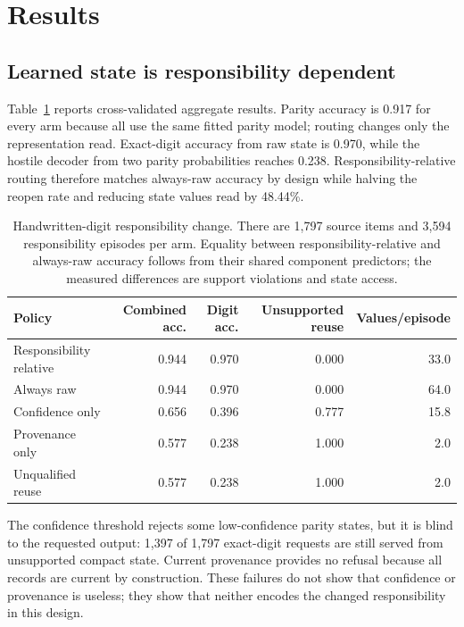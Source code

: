 \documentclass[10pt]{article}
\begin{document}
\section{Results}

\subsection{Learned state is responsibility dependent}

Table~\ref{tab:digits} reports cross-validated aggregate results. Parity accuracy is 0.917 for every arm because all use the same fitted parity model; routing changes only the representation read. Exact-digit accuracy from raw state is 0.970, while the hostile decoder from two parity probabilities reaches 0.238. Responsibility-relative routing therefore matches always-raw accuracy by design while halving the reopen rate and reducing state values read by 48.44\%.

\begin{table}[t]
\centering
\small
\caption{Handwritten-digit responsibility change. There are 1,797 source items and 3,594 responsibility episodes per arm. Equality between responsibility-relative and always-raw accuracy follows from their shared component predictors; the measured differences are support violations and state access.}
\label{tab:digits}
\begin{tabular}{lrrrr}
\toprule
Policy & Combined acc. & Digit acc. & Unsupported reuse & Values/episode \\
\midrule
Responsibility relative & 0.944 & 0.970 & 0.000 & 33.0 \\
Always raw & 0.944 & 0.970 & 0.000 & 64.0 \\
Confidence only & 0.656 & 0.396 & 0.777 & 15.8 \\
Provenance only & 0.577 & 0.238 & 1.000 & 2.0 \\
Unqualified reuse & 0.577 & 0.238 & 1.000 & 2.0 \\
\bottomrule
\end{tabular}
\end{table}

The confidence threshold rejects some low-confidence parity states, but it is blind to the requested output: 1,397 of 1,797 exact-digit requests are still served from unsupported compact state. Current provenance provides no refusal because all records are current by construction. These failures do not show that confidence or provenance is useless; they show that neither encodes the changed responsibility in this design.
\end{document}
